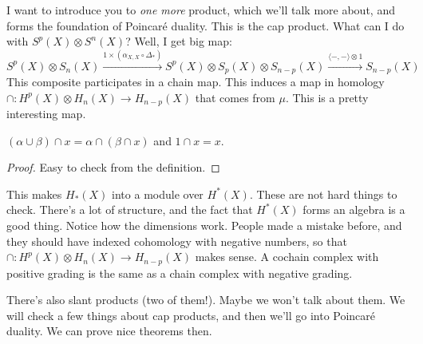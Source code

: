 I want to introduce you to \emph{one more} product, which we'll talk more about, and forms the foundation of Poincar\'{e} duality. This is the cap product. What can I do with $S^p(X)\otimes S^n(X)$? Well, I get big map:
\begin{equation*}
S^p(X)\otimes S_n(X)\xrightarrow{1\times (\alpha_{X,X}\circ \Delta_\ast)} S^p(X)\otimes S_p(X)\otimes S_{n-p}(X)\xrightarrow{\langle -,-\rangle\otimes 1}S_{n-p}(X)
\end{equation*}
This composite participates in a chain map. This induces a map in homology $\cap: H^p(X)\otimes H_n(X)\to H_{n-p}(X)$ that comes from $\mu$. This is a pretty interesting map.
\begin{lemma}
$(\alpha\cup\beta)\cap x=\alpha\cap(\beta\cap x)$ and $1\cap x=x$.
\end{lemma}
\begin{proof}
Easy to check from the definition.
\end{proof}
This makes $ H_\ast(X)$ into a module over $ H^\ast(X)$. These are not hard things to check. There's a lot of structure, and the fact that $ H^\ast(X)$ forms an algebra is a good thing. Notice how the dimensions work. People made a mistake before, and they should have indexed cohomology with negative numbers, so that $\cap: H^p(X)\otimes H_n(X)\to H_{n-p}(X)$ makes sense. A cochain complex with positive grading is the same as a chain complex with negative grading.

There's also slant products (two of them!). Maybe we won't talk about them. We will check a few things about cap products, and then we'll go into Poincar\'{e} duality. We can prove nice theorems then.

